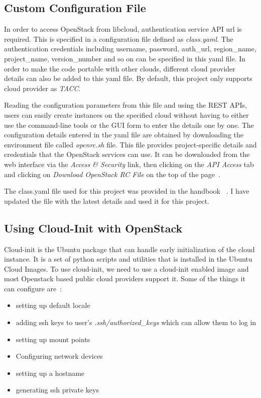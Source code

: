 \subsection{Custom Configuration File}
In order to access OpenStack from libcloud, authentication service API url is
required. This is specified in a configuration file defined as
\textit{class.yaml}. The authentication credentials including username,
password, auth\_url, region\_name, project\_name, version\_number and so on 
can be specified in this yaml file. In order to make the code portable with 
other clouds, different cloud provider details can also be added to this yaml 
file. By default, this project only supports cloud provider as \textit{TACC}. 

Reading the configuration parameters from this file and using the REST APIs,
users can easily create instances on the specified cloud without having to
either use the command-line tools or the GUI form to enter the details one by
one. The configuration details entered in the yaml file are obtained by
downloading the environment file called \textit{openrc.sh} file. This file 
provides project-specific details and credentials that the OpenStack services 
can use. It can be downloaded from the web interface via the 
\textit{Access \& Security} link, then clicking on the 
\textit{API Access} tab and clicking on \textit{Download OpenStack RC File} 
on the top of the page~\cite{hid-sp18-516-www-openrc}. 

The class.yaml file used for this project was provided in the handbook
~\cite{hid-sp18-516-las-handbook}. I have updated the file with the latest 
details and used it for this project. 

\subsection{Using Cloud-Init with OpenStack}
Cloud-init is the Ubuntu package that can handle early initialization of the
cloud instance. It is a set of python scripts and utilities that is installed 
in the Ubuntu Cloud Images. To use cloud-init, we need to use a cloud-init 
enabled image and most Openstack based public cloud providers support it. 
Some of the things it can configure are~\cite{hid-sp18-516-www-cloud-init}:

\begin{itemize}
\item setting up default locale
\item adding ssh keys to user's \textit{.ssh/authorized\_keys} which can 
allow them to log in
\item setting up mount points
\item Configuring network devices
\item setting up a hostname
\item generating ssh private keys
\end{itemize}

